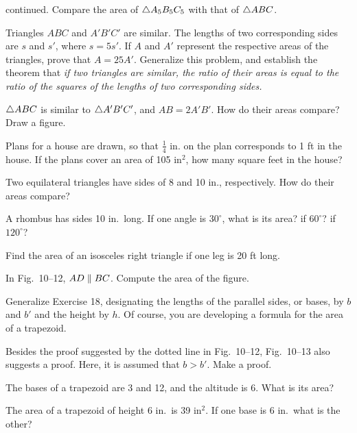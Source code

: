 \documentclass[11pt]{book}
\begin{document}
\begin{exercisecols}
\begin{exlist}
  continued. Compare the area of $\triangle A_5B_5C_5$ with that of $\triangle ABC$.
\item[\stex 12.] Triangles $ABC$ and $A'B'C'$ are similar. The lengths of two
  corresponding sides are $s$ and $s'$, where $s = 5s'$. If $A$ and $A'$
  represent the respective areas of the triangles, prove that $A = 25A'$.
  Generalize this problem, and establish the theorem that \emph{if two
  triangles are similar, the ratio of their areas is equal to the ratio of the
  squares of the lengths of two corresponding sides.}
\item[13.] $\triangle ABC$ is similar to $\triangle A'B'C'$, and $AB = 2A'B'$. How do
  their areas compare? Draw a figure.
\item[\stex 14.] Plans for a house are drawn, so that $\frac{1}{4}$ in. on the
  plan corresponds to 1 ft in the house. If the plans cover an area of
  105 in$^2$, how many square feet in the house?
\item[15.] Two equilateral triangles have sides of 8 and 10 in.,
  respectively. How do their areas compare?
\item[16.] A rhombus has sides 10 in.\ long. If one angle is $30^\circ$, what
  is its area? if $60^\circ$? if $120^\circ$?
\item[17.] Find the area of an isosceles right triangle if one leg is 20 ft
  long.
\item[18.] In Fig.~10--12, $AD \mathrel{\|} BC$. Compute the area of the figure.
\exfig{\FIGXTWELVE}
\item[\stex 19.] Generalize Exercise 18, designating the lengths of the
  parallel sides, or bases, by $b$ and $b'$ and the height by $h$. Of course,
  you are developing a formula for the area of a trapezoid.
\item[20.] Besides the proof suggested by the dotted line in Fig.~10--12,
  Fig.~10--13 also suggests a proof. Here, it is assumed that $b > b'$. Make a
  proof.
\exfig{\FIGXTHIRTEEN}
\setcounter{exlisti}{20}
\item The bases of a trapezoid are 3 and 12, and the altitude is 6. What is
  its area?
\item The area of a trapezoid of height 6 in.\ is 39 in$^2$. If one base is
  6 in.\ what is the other?

\end{exlist}
\end{exercisecols}
\end{document}
